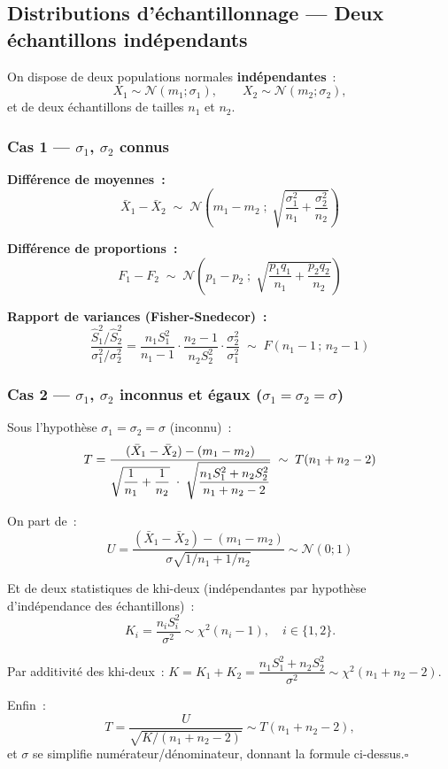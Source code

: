 \documentclass[11pt,a4paper]{article}
\newcommand{\N}{\mathcal{N}}
\begin{document}
\subsection{Distributions d'\'echantillonnage --- Deux \'echantillons ind\'ependants}

On dispose de deux populations normales \textbf{ind\'ependantes}~:
$$X_1 \sim \N(m_1;\sigma_1), \qquad X_2 \sim \N(m_2;\sigma_2),$$
et de deux \'echantillons de tailles $n_1$ et $n_2$.

\subsubsection{Cas 1 --- $\sigma_1$, $\sigma_2$ connus}

\begin{thmbox}
\textbf{Diff\'erence de moyennes~:}
$$\bar{X}_1 - \bar{X}_2 \;\sim\; \N\!\left(m_1-m_2\;;\;
  \sqrt{\frac{\sigma_1^2}{n_1}+\frac{\sigma_2^2}{n_2}}\right)$$

\textbf{Diff\'erence de proportions~:}
$$F_1 - F_2 \;\sim\; \N\!\left(p_1-p_2\;;\;
  \sqrt{\frac{p_1q_1}{n_1}+\frac{p_2q_2}{n_2}}\right)$$

\textbf{Rapport de variances (Fisher-Snedecor)~:}
$$\frac{\hat{S}_1^2/\hat{S}_2^2}{\sigma_1^2/\sigma_2^2}
  = \frac{n_1S_1^2}{n_1-1}\cdot\frac{n_2-1}{n_2S_2^2}\cdot\frac{\sigma_2^2}{\sigma_1^2}
  \;\sim\; F(n_1-1\,;\,n_2-1)$$
\end{thmbox}

\subsubsection{Cas 2 --- $\sigma_1$, $\sigma_2$ inconnus et \'egaux ($\sigma_1=\sigma_2=\sigma$)}

\begin{thmbox}
Sous l'hypoth\`ese $\sigma_1=\sigma_2=\sigma$ (inconnu)~:
$$T = \frac{(\bar{X}_1-\bar{X}_2)-(m_1-m_2)}{%
  \sqrt{\dfrac{1}{n_1}+\dfrac{1}{n_2}}\;\cdot\;
  \sqrt{\dfrac{n_1S_1^2+n_2S_2^2}{n_1+n_2-2}}} \;\sim\; T(n_1+n_2-2)$$
\end{thmbox}

\begin{demobox}
On part de~:
$$U = \frac{(\bar{X}_1-\bar{X}_2)-(m_1-m_2)}{\sigma\sqrt{1/n_1+1/n_2}} \sim \N(0;1)$$

Et de deux statistiques de khi-deux (ind\'ependantes par hypoth\`ese d'ind\'ependance des \'echantillons)~:
$$K_i = \frac{n_iS_i^2}{\sigma^2} \sim \chi^2(n_i-1), \quad i\in\{1,2\}.$$

Par additivit\'e des khi-deux~: $K = K_1+K_2 = \dfrac{n_1S_1^2+n_2S_2^2}{\sigma^2} \sim \chi^2(n_1+n_2-2)$.

Enfin~:
$$T = \frac{U}{\sqrt{K/(n_1+n_2-2)}} \sim T(n_1+n_2-2),$$
et $\sigma$ se simplifie num\'erateur/d\'enominateur, donnant la formule ci-dessus.\hfill$\square$
\end{demobox}
\end{document}

